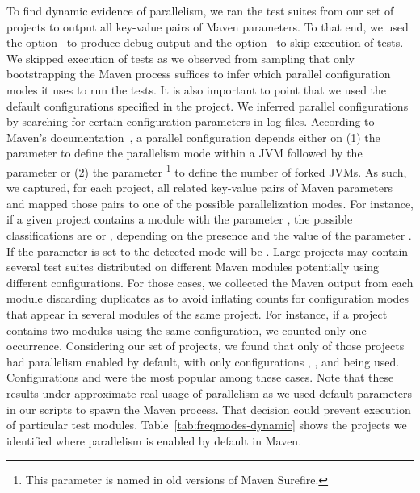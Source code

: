 \documentclass[10pt,journal,compsoc]{IEEEtran}
\begin{document}
To find dynamic evidence of parallelism, we ran the test suites from
our set of \numMedLong{} projects to output all key-value pairs of
Maven parameters.  To that end, we used the option~ to
produce debug output and the option~ to skip
execution of tests.  We skipped execution of tests as we observed from
sampling that only bootstrapping the Maven process suffices to infer
which parallel configuration modes it uses to run the
tests.  It is also important to point that we used the default
configurations specified in the project.  We inferred parallel
configurations by searching for certain configuration parameters in
log files. According to Maven's
documentation~\cite{maven-surefire-plugin}, a parallel configuration
depends either on (1) the parameter  to define the
parallelism mode within a JVM followed by the parameter
 or (2) the parameter
\footnote{This parameter is named 
  in old versions of Maven Surefire.} to define the number of forked
JVMs.  As such, we captured, for each project, all related key-value
pairs of Maven parameters and mapped those pairs to one of the
possible parallelization modes.  For instance, if a given project
contains a module with the parameter
, the possible classifications are
\ForkSeq{} or \ForkParMeth{}, depending on the presence and the value
of the parameter .  If the parameter
 is set to  the detected mode will be
\ForkParMeth{}.  Large projects may contain several test suites
distributed on different Maven modules potentially using different
configurations.  For those cases, we collected the Maven output from
each module discarding duplicates as to avoid inflating counts for
configuration modes that appear in several modules of the same
project. For instance, if a project contains two modules using the
same configuration, we counted only one occurrence.
Considering
our set of \numMedLong{} projects, we found that only
\numProjectsPar{} of those projects had parallelism enabled
by default, with only configurations \ParClassSeqMeth{},
\ParClassParMeth{}, and \ForkSeq{} being used. Configurations
\ParClassParMeth{} and \ForkSeq{} were the most popular among these
cases. Note that these results under-approximate real usage of
parallelism as we used default parameters in our scripts to spawn the
Maven process.  That decision could prevent execution of particular
test modules. Table~\ref{tab:freqmodes-dynamic} shows the
\numProjectsPar{} projects we identified where parallelism is enabled by default in Maven.
\end{document}
